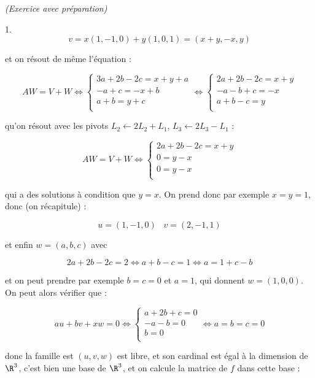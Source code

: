 \documentclass[11pt]{article}%
\begin{document}
\begin{exercice}{\it (Exercice avec préparation)}
\begin{noliste}{1.}
\[
 v = x (1,-1,0) + y (1,0,1) = (x + y, -x, y ) 
\]

 et on résout de même l'équation : 
 
\[
 A W = V + W \Longleftrightarrow \left\{ 
\begin{array}{c}
 3 a + 2 b - 2 c = x + y + a \\
- a + c = -x + b \\
a + b = y + c \\
\end{array}
\right. \Longleftrightarrow \left\{ 
\begin{array}{c}
 2 a + 2 b - 2 c = x + y \\
- a - b + c = -x \\
a + b - c = y \\
\end{array}
\right. 
\]

 qu'on résout avec les pivots $L_{2} \leftarrow 2 L_{2} + L_{1}$,
$L_{3} \leftarrow 2 L_{3} - L_{1}$ : 
 
\[
 A W = V + W \Longleftrightarrow \left\{ 
\begin{array}{c}
 2 a + 2 b - 2 c = x + y \\
0 = y-x \\
0 = y-x\\
\end{array}
\right. 
\]

 qui a des solutions à condition que $y = x$. On prend donc par exemple
$x = y = 1$, donc (on récapitule) : 
 
\[
 u = (1,-1,0) \ \, \ \ v = (2, -1, 1 ) 
\]

 et enfin $w = (a,b,c)$ avec 
 
\[
 2 a + 2 b - 2c = 2 \Longleftrightarrow a + b - c = 1
\Longleftrightarrow a = 1 + c - b 
\]

 et on peut prendre par exemple $b = c = 0$ et $a = 1$, qui donnent $w
= (1,0,0)$. On peut alors vérifier que :
 
\[
 a u + b v + x w = 0 \Longleftrightarrow \left\{ 
\begin{array}{c}
 a + 2 b + c = 0 \\
- a - b = 0 \\
b = 0 \\
\end{array}
\right. \Longleftrightarrow a = b = c = 0 
\]

 donc la famille est $(u,v,w)$ est libre, et son cardinal est égal à la
dimension de $\R^{3}$, c'est bien une base de $\R^{3}$, et on calcule
la matrice de $f$ dans cette base : 
 

\end{noliste}
\end{exercice}
\end{document}
